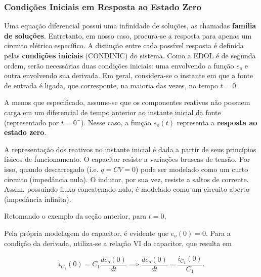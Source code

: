 \documentclass{article}
\numberwithin{equation}{section}
\let\dfr\dfrac
\begin{document}
\subsubsection{Condições Iniciais em Resposta ao Estado Zero}
\label{subsubsec:condinics}

Uma equação diferencial possui uma infinidade de soluções, as chamadas \textbf{família de soluções}. Entretanto, em nosso caso, procura-se a resposta para apenas um circuito elétrico específico. A distinção entre cada possível resposta é definida pelas \textbf{condições iniciais} (CONDINIC) do sistema. Como a EDOL é de segunda ordem, serão necessárias duas condições iniciais: uma envolvendo a função $e_o$ e outra envolvendo sua derivada. Em geral, considera-se o instante em que a fonte de entrada é ligada, que corresponte, na maioria das vezes, no tempo $t=0$.

A menos que especificado, assume-se que os componentes reativos não possuem carga em um diferencial de tempo anterior ao instante inicial da fonte (representado por $t=0^-$). Nesse caso, a função $e_o(t)$ representa a \textbf{resposta ao estado zero}.

A representação dos reativos no instante inicial é dada a partir de seus princípios físicos de funcionamento. O capacitor resiste a variações bruscas de tensão. Por isso, quando descarregado (i.e. $q=CV=0$) pode ser modelado como um curto circuito (impedância nula). O indutor, por sua vez, resiste a saltos de corrente. Assim, possuindo fluxo concatenado nulo, é modelado como um circuito aberto (impedância infinita).

Retomando o exemplo da seção anterior, para $t=0$,

\begin{center}
\end{center}

Pela própria modelagem do capacitor, é evidente que $e_o(0)=0$. Para a condição da derivada, utiliza-se a relação VI do capacitor, que resulta em

\begin{equation*}
    i_{C_1}(0) = C_1\dfr{de_o(0)}{dt} \implies \dfr{de_o(0)}{dt} = \dfr{i_{C_1}(0)}{C_1}.
\end{equation*}
\end{document}
